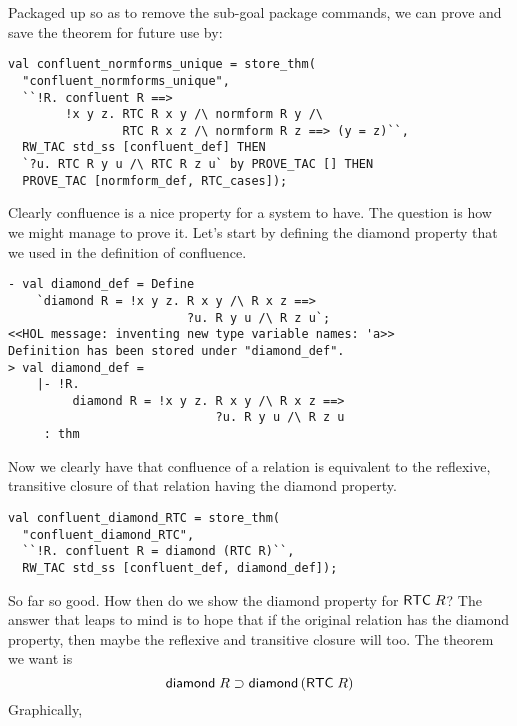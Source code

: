Packaged up so as to remove the sub-goal package commands, we can
prove and save the theorem for future use by:
\begin{session}
\begin{verbatim}
val confluent_normforms_unique = store_thm(
  "confluent_normforms_unique",
  ``!R. confluent R ==>
        !x y z. RTC R x y /\ normform R y /\
                RTC R x z /\ normform R z ==> (y = z)``,
  RW_TAC std_ss [confluent_def] THEN
  `?u. RTC R y u /\ RTC R z u` by PROVE_TAC [] THEN
  PROVE_TAC [normform_def, RTC_cases]);
\end{verbatim}
\end{session}
\eos{}

Clearly confluence is a nice property for a system to have.  The
question is how we might manage to prove it.  Let's start by defining
the diamond property that we used in the definition of confluence.
\begin{session}
\begin{verbatim}
- val diamond_def = Define
    `diamond R = !x y z. R x y /\ R x z ==>
                         ?u. R y u /\ R z u`;
<<HOL message: inventing new type variable names: 'a>>
Definition has been stored under "diamond_def".
> val diamond_def =
    |- !R.
         diamond R = !x y z. R x y /\ R x z ==>
                             ?u. R y u /\ R z u
     : thm
\end{verbatim}
\end{session}
    Now we clearly have that confluence of a relation is equivalent to
    the reflexive, transitive closure of that relation having the
    diamond property.
\begin{session}
\begin{verbatim}
val confluent_diamond_RTC = store_thm(
  "confluent_diamond_RTC",
  ``!R. confluent R = diamond (RTC R)``,
  RW_TAC std_ss [confluent_def, diamond_def]);
\end{verbatim}
\end{session}
    So far so good.  How then do we show the diamond property for
    ${\sf RTC}\;R$?  The answer that leaps to mind is to hope that if
    the original relation has the diamond property, then maybe the
    reflexive and transitive closure will too.  The theorem we want is
    \[ {\sf diamond}\;R \supset {\sf diamond}\,({\sf RTC}\;R)\] Graphically,
